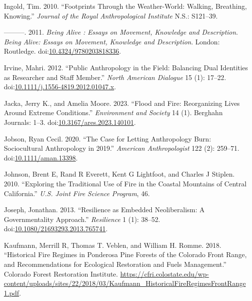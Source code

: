 \documentclass[
]{article}
\newlength{\cslhangindent}
\newenvironment{CSLReferences}[2] %
 {\begin{list}{}{%
  \setlength{\itemindent}{0pt}
  \setlength{\leftmargin}{0pt}
  \setlength{\parsep}{0pt}
  \ifodd #1
   \setlength{\leftmargin}{\cslhangindent}
   \setlength{\itemindent}{-1\cslhangindent}
  \fi
  \setlength{\itemsep}{#2\baselineskip}}}
 {\end{list}}
\begin{document}
\begin{CSLReferences}{1}{0}
Ingold, Tim. 2010. {``Footprints Through the Weather-World: Walking, Breathing, Knowing.''} \emph{Journal of the Royal Anthropological Institute} N.S.: S121--39.

---------. 2011. \emph{Being {Alive} : {Essays} on {Movement}, {Knowledge} and {Description}}. \emph{Being Alive: Essays on Movement, Knowledge and Description}. London: Routledge. doi:\href{https://doi.org/10.4324/9780203818336}{10.4324/9780203818336}.

Irvine, Mahri. 2012. {``Public {Anthropology} in the {Field}: {Balancing Dual Identities} as {Researcher} and {Staff Member}.''} \emph{North American Dialogue} 15 (1): 17--22. doi:\href{https://doi.org/10.1111/j.1556-4819.2012.01047.x}{10.1111/j.1556-4819.2012.01047.x}.

Jacka, Jerry K., and Amelia Moore. 2023. {``Flood and {Fire}: {Reorganizing Lives} Around {Extreme Conditions}.''} \emph{Environment and Society} 14 (1). Berghahn Journals: 1--3. doi:\href{https://doi.org/10.3167/ares.2023.140101}{10.3167/ares.2023.140101}.

Jobson, Ryan Cecil. 2020. {``The {Case} for {Letting Anthropology Burn}: {Sociocultural Anthropology} in 2019.''} \emph{American Anthropologist} 122 (2): 259--71. doi:\href{https://doi.org/10.1111/aman.13398}{10.1111/aman.13398}.

Johnson, Brent E, Rand R Everett, Kent G Lightfoot, and Charles J Stiplen. 2010. {``Exploring the {Traditional Use} of {Fire} in the {Coastal Mountains} of {Central California}.''} \emph{U.S. Joint Fire Science Program}, 46.

Joseph, Jonathan. 2013. {``Resilience as Embedded Neoliberalism: A Governmentality Approach.''} \emph{Resilience} 1 (1): 38--52. doi:\href{https://doi.org/10.1080/21693293.2013.765741}{10.1080/21693293.2013.765741}.

Kaufmann, Merrill R, Thomas T. Veblen, and William H. Romme. 2018. {``Historical {Fire Regimes} in {Ponderosa Pine Forests} of the {Colorado Front Range}, and {Recommendations} for {Ecological Restoration} and {Fuels Management}.''} Colorado Forest Restoration Institute. \url{https://cfri.colostate.edu/wp-content/uploads/sites/22/2018/03/Kaufmann_HistoricalFireRegimesFrontRange1.pdf}.


\end{CSLReferences}
\end{document}
